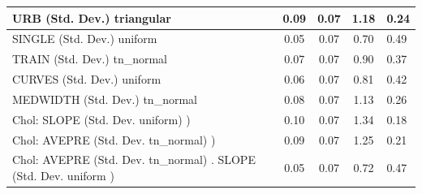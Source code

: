 \begin{table}
\begin{center}
\begin{tabular}{|l|l|c|c|c|l|}
			\hline
			URB (Std. Dev.) triangular &  & 0.09 & 0.07 & 1.18 & 0.24 \\
			\hline
			SINGLE (Std. Dev.) uniform &  & 0.05 & 0.07 & 0.70 & 0.49 \\
			\hline
			TRAIN (Std. Dev.) tn_normal &  & 0.07 & 0.07 & 0.90 & 0.37 \\
			\hline
			CURVES (Std. Dev.) uniform &  & 0.06 & 0.07 & 0.81 & 0.42 \\
			\hline
			MEDWIDTH (Std. Dev.) tn_normal &  & 0.08 & 0.07 & 1.13 & 0.26 \\
			\hline
			 Chol: SLOPE (Std. Dev. uniform) ) &  & 0.10 & 0.07 & 1.34 & 0.18 \\
			\hline
			 Chol: AVEPRE (Std. Dev. tn_normal) ) &  & 0.09 & 0.07 & 1.25 & 0.21 \\
			\hline
			 Chol: AVEPRE (Std. Dev. tn_normal) . SLOPE (Std. Dev.   uniform ) &  & 0.05 & 0.07 & 0.72 & 0.47 \\
			\hline
		\end{tabular}
	\end{center}
\end{table}